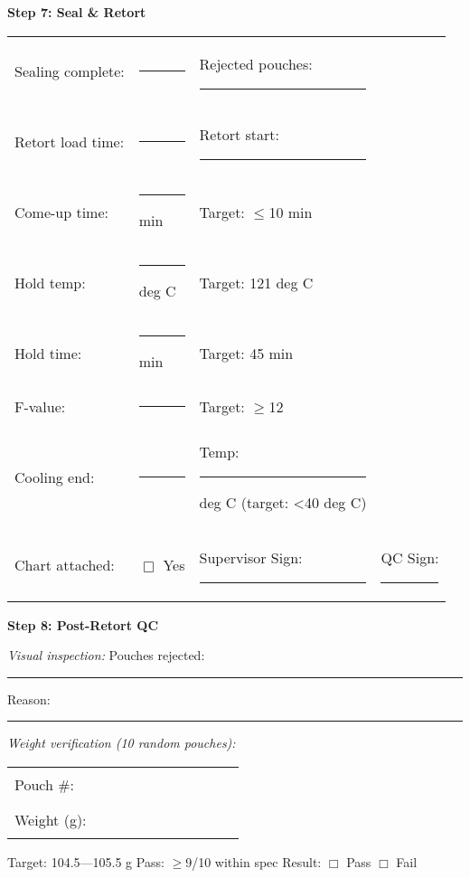 {\noindent\textbf{Step 7: Seal \& Retort}

\begin{tabular}{@{}lp{3cm}p{3cm}p{3cm}@{}}
Sealing complete: & \rule{2.5cm}{0.4pt} & Rejected pouches: \rule{2cm}{0.4pt} & \\
Retort load time: & \rule{2.5cm}{0.4pt} & Retort start: \rule{2.5cm}{0.4pt} & \\
Come-up time: & \rule{2.5cm}{0.4pt} min & Target: $\le$10 min & \\
Hold temp: & \rule{2.5cm}{0.4pt} deg C & Target: 121 deg C & \\
Hold time: & \rule{2.5cm}{0.4pt} min & Target: 45 min & \\
F-value: & \rule{2.5cm}{0.4pt} & Target: $\ge$12 & \\
Cooling end: & \rule{2.5cm}{0.4pt} & Temp: \rule{2cm}{0.4pt} deg C (target: <40 deg C) & \\
Chart attached: & $\Box$ Yes & Supervisor Sign: \rule{2.5cm}{0.4pt} & QC 
Sign: \rule{2.5cm}{0.4pt} \\
\end{tabular}

\vspace{1em}

\noindent\textbf{Step 8: Post-Retort QC}

\noindent\textit{Visual inspection:} Pouches rejected: \rule{2cm}{0.4pt} \hspace{1cm} Reason: \rule{6cm}{0.4pt}

\vspace{0.5em}

\noindent\textit{Weight verification (10 random pouches):}

\begin{tabular}{@{}lcccccccccc@{}}
Pouch \#: & \rule{1cm}{0.4pt} & \rule{1cm}{0.4pt} & \rule{1cm}{0.4pt} & \rule{1cm}{0.4pt} & \rule{1cm}{0.4pt} & \rule{1cm}{0.4pt} & \rule{1cm}{0.4pt} & \rule{1cm}{0.4pt} & \rule{1cm}{0.4pt} & \rule{1cm}{0.4pt} \\
Weight (g): & \rule{1cm}{0.4pt} & \rule{1cm}{0.4pt} & \rule{1cm}{0.4pt} & \rule{1cm}{0.4pt} & \rule{1cm}{0.4pt} & \rule{1cm}{0.4pt} & \rule{1cm}{0.4pt} & \rule{1cm}{0.4pt} & \rule{1cm}{0.4pt} & \rule{1cm}{0.4pt} \\
\end{tabular}

\noindent Target: 104.5---105.5 g \hspace{2cm} Pass: $\ge$9/10 within spec \hspace{2cm} Result: $\Box$ Pass $\Box$ Fail

}
